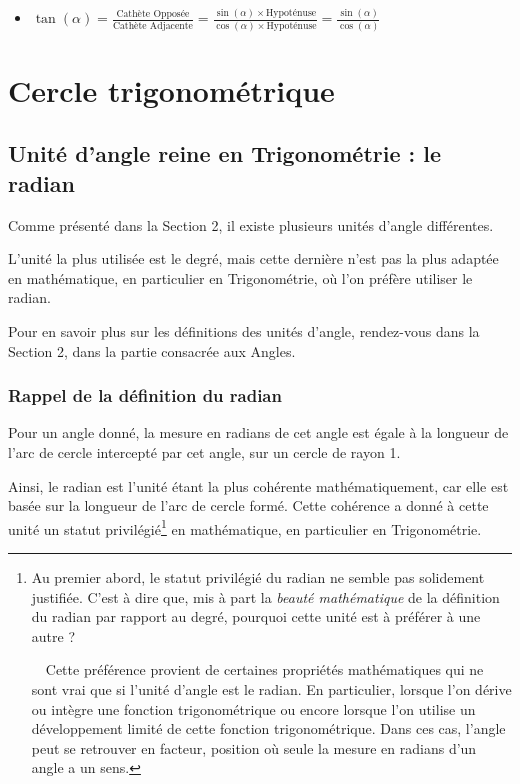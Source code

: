 \documentclass[a4paper]{article}
\begin{document}
			\bigbreak

			\begin{Large}
			\begin{itemize}
				\item [ ] $\tan(\alpha) = \frac{\text{Cathète Opposée}}{\text{Cathète Adjacente}} = \frac{\sin(\alpha) \times \text{Hypoténuse}}{\cos(\alpha) \times \text{Hypoténuse}} = \frac{\sin(\alpha)}{\cos(\alpha)}$
			\end{itemize}
			\end{Large}

			\vfill

\newpage

	\section{Cercle trigonométrique}

		\subsection{Unité d'angle reine en Trigonométrie : le radian}

			Comme présenté dans la Section 2, 
			il existe plusieurs unités d'angle différentes.

			L'unité la plus utilisée est le degré, 
			mais cette dernière n'est pas la plus adaptée 
			en mathématique, en particulier en Trigonométrie,
			où l'on préfère utiliser le radian.

			Pour en savoir plus sur les définitions des unités d'angle,
			rendez-vous dans la Section 2, dans la partie consacrée aux Angles.

			\subsubsection*{Rappel de la définition du radian}

				Pour un angle donné, 
				la mesure en radians de cet angle est égale 
				à la longueur de l'arc de cercle intercepté par cet angle,
				sur un cercle de rayon 1.

				Ainsi, le radian est l'unité étant la plus cohérente mathématiquement,
				car elle est basée sur la longueur de l'arc de cercle formé.
				Cette cohérence a donné à cette unité un statut privilégié\footnote{
					Au premier abord, 
					le statut privilégié du radian ne semble pas solidement justifiée.
					C'est à dire que, mis à part la \textit{beauté mathématique} 
					de la définition du radian par rapport au degré, 
					pourquoi cette unité est à préférer à une autre ?
					
					~~Cette préférence provient de certaines propriétés mathématiques 
					qui ne sont vrai que si l'unité d'angle est le radian.
					En particulier, lorsque l'on dérive ou intègre une 
					fonction trigonométrique ou encore lorsque 
					l'on utilise un développement limité de 
					cette fonction trigonométrique.
					Dans ces cas, l'angle peut se retrouver en facteur, 
					position où seule la mesure en radians d'un angle a un sens.
				} en mathématique, en particulier en Trigonométrie.
\end{document}
